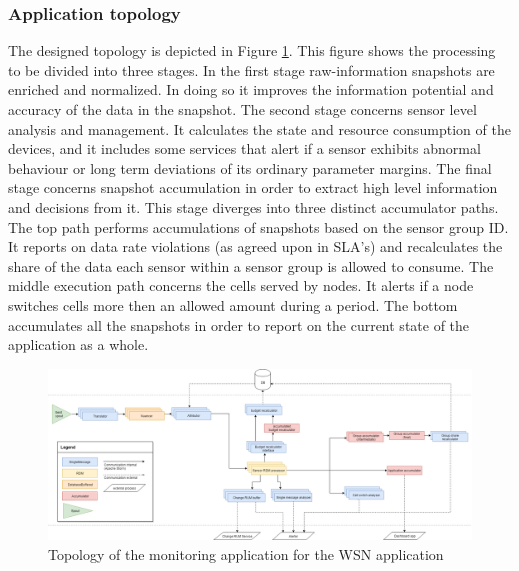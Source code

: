 \subsubsection{Application topology}
The designed topology is depicted in Figure \ref{fig:sensit_topology}. This figure shows the processing to be divided into three stages. In the first stage raw-information snapshots are enriched and normalized. In doing so it improves the information potential and accuracy of the data in the snapshot. The second stage concerns sensor level analysis and management. It calculates the state and resource consumption of the devices, and it includes some services that alert if a sensor exhibits abnormal behaviour or long term deviations of its ordinary parameter margins. The final stage concerns snapshot accumulation in order to extract high level information and decisions from it. This stage diverges into three distinct accumulator paths. The top path performs accumulations of snapshots based on the sensor group ID. It reports on data rate violations (as agreed upon in SLA's) and recalculates the share of the data each sensor within a sensor group is allowed to consume. The middle execution path concerns the cells served by nodes. It alerts if a node switches cells more then an allowed amount during a period. The bottom accumulates all the snapshots in order to report on the current state of the application as a whole.

\begin{figure}
\centering
\includegraphics[width=1.15\textwidth]{resources/img/sensit_topology.png}
\caption{Topology of the monitoring application for the \idsystems\sensit WSN application}
\label{fig:sensit_topology}
\end{figure}

